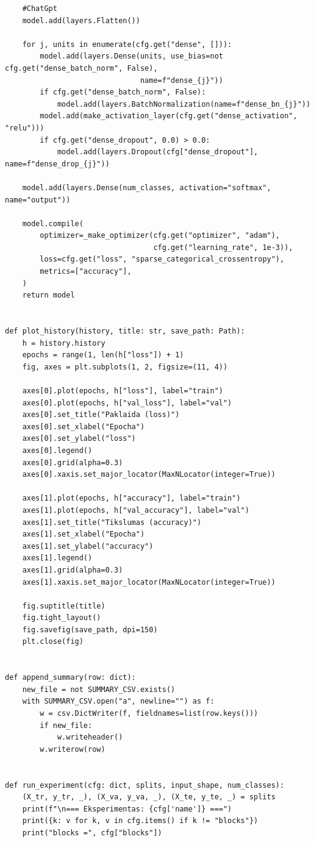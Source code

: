 \documentclass[]{VUMIFTemplateClass}
\begin{document}
\begin{verbatim}
    #ChatGpt
    model.add(layers.Flatten())

    for j, units in enumerate(cfg.get("dense", [])):
        model.add(layers.Dense(units, use_bias=not cfg.get("dense_batch_norm", False),
                               name=f"dense_{j}"))
        if cfg.get("dense_batch_norm", False):
            model.add(layers.BatchNormalization(name=f"dense_bn_{j}"))
        model.add(make_activation_layer(cfg.get("dense_activation", "relu")))
        if cfg.get("dense_dropout", 0.0) > 0.0:
            model.add(layers.Dropout(cfg["dense_dropout"], name=f"dense_drop_{j}"))

    model.add(layers.Dense(num_classes, activation="softmax", name="output"))

    model.compile(
        optimizer=_make_optimizer(cfg.get("optimizer", "adam"),
                                  cfg.get("learning_rate", 1e-3)),
        loss=cfg.get("loss", "sparse_categorical_crossentropy"),
        metrics=["accuracy"],
    )
    return model


def plot_history(history, title: str, save_path: Path):
    h = history.history
    epochs = range(1, len(h["loss"]) + 1)
    fig, axes = plt.subplots(1, 2, figsize=(11, 4))

    axes[0].plot(epochs, h["loss"], label="train")
    axes[0].plot(epochs, h["val_loss"], label="val")
    axes[0].set_title("Paklaida (loss)")
    axes[0].set_xlabel("Epocha")
    axes[0].set_ylabel("loss")
    axes[0].legend()
    axes[0].grid(alpha=0.3)
    axes[0].xaxis.set_major_locator(MaxNLocator(integer=True))

    axes[1].plot(epochs, h["accuracy"], label="train")
    axes[1].plot(epochs, h["val_accuracy"], label="val")
    axes[1].set_title("Tikslumas (accuracy)")
    axes[1].set_xlabel("Epocha")
    axes[1].set_ylabel("accuracy")
    axes[1].legend()
    axes[1].grid(alpha=0.3)
    axes[1].xaxis.set_major_locator(MaxNLocator(integer=True))

    fig.suptitle(title)
    fig.tight_layout()
    fig.savefig(save_path, dpi=150)
    plt.close(fig)


def append_summary(row: dict):
    new_file = not SUMMARY_CSV.exists()
    with SUMMARY_CSV.open("a", newline="") as f:
        w = csv.DictWriter(f, fieldnames=list(row.keys()))
        if new_file:
            w.writeheader()
        w.writerow(row)


def run_experiment(cfg: dict, splits, input_shape, num_classes):
    (X_tr, y_tr, _), (X_va, y_va, _), (X_te, y_te, _) = splits
    print(f"\n=== Eksperimentas: {cfg['name']} ===")
    print({k: v for k, v in cfg.items() if k != "blocks"})
    print("blocks =", cfg["blocks"])


\end{verbatim}
\end{document}
